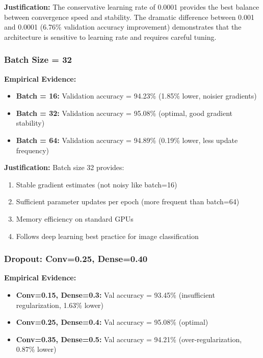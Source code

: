 \documentclass[11pt,a4paper]{article}
\begin{document}
\textbf{Justification:} The conservative learning rate of 0.0001 provides the best balance between convergence speed and stability. The dramatic difference between 0.001 and 0.0001 (6.76\% validation accuracy improvement) demonstrates that the architecture is sensitive to learning rate and requires careful tuning.

\subsubsection{Batch Size = 32}

\textbf{Empirical Evidence:}
\begin{itemize}
    \item \textbf{Batch = 16:} Validation accuracy = 94.23\% (1.85\% lower, noisier gradients)
    \item \textbf{Batch = 32:} Validation accuracy = 95.08\% (optimal, good gradient stability)
    \item \textbf{Batch = 64:} Validation accuracy = 94.89\% (0.19\% lower, less update frequency)
\end{itemize}

\textbf{Justification:} Batch size 32 provides:
\begin{enumerate}
    \item Stable gradient estimates (not noisy like batch=16)
    \item Sufficient parameter updates per epoch (more frequent than batch=64)
    \item Memory efficiency on standard GPUs
    \item Follows deep learning best practice for image classification
\end{enumerate}

\subsubsection{Dropout: Conv=0.25, Dense=0.40}

\textbf{Empirical Evidence:}
\begin{itemize}
    \item \textbf{Conv=0.15, Dense=0.3:} Val accuracy = 93.45\% (insufficient regularization, 1.63\% lower)
    \item \textbf{Conv=0.25, Dense=0.4:} Val accuracy = 95.08\% (optimal)
    \item \textbf{Conv=0.35, Dense=0.5:} Val accuracy = 94.21\% (over-regularization, 0.87\% lower)
\end{itemize}
\end{document}
